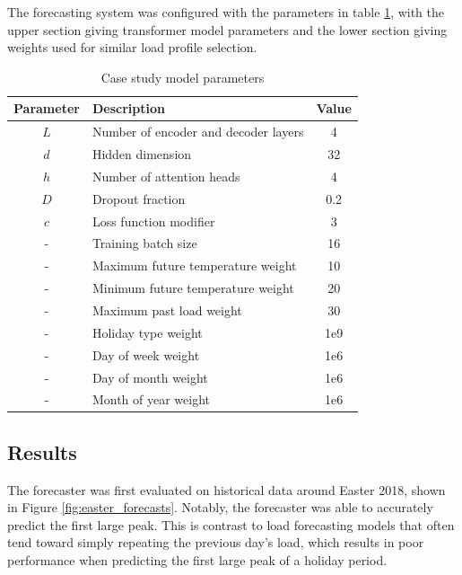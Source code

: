 \documentclass[conference]{IEEEtran}
\begin{document}
The forecasting system was configured with the parameters in table \ref{table:parameters}, with the upper section giving transformer model parameters and the lower section giving weights used for similar load profile selection.

\begin{table}[htbp]
	\caption{Case study model parameters}
	\begin{center}
		\begin{tabular}{clc}
			\textbf{Parameter}&\textbf{Description}&\textbf{Value} \\
			\hline
			$L$ & Number of encoder and decoder layers & 4 \\
			$d$ & Hidden dimension & 32 \\
			$h$ & Number of attention heads & 4 \\
			$D$ & Dropout fraction & 0.2 \\
			$c$ & Loss function modifier & 3 \\
			-   & Training batch size & 16 \\
			\hline
			-   & Maximum future temperature weight & 10 \\
			-   & Minimum future temperature weight & 20 \\
			-   & Maximum past load weight & 30 \\
			-   & Holiday type weight & 1e9 \\
			-   & Day of week weight & 1e6 \\
			-   & Day of month weight & 1e6 \\
			-   & Month of year weight & 1e6 \\
			
		\end{tabular}
		\label{table:parameters}
	\end{center}
\end{table}

\subsection{Results}

The forecaster was first evaluated on historical data around Easter 2018, shown in Figure \ref{fig:easter_forecasts}.
Notably, the forecaster was able to accurately predict the first large peak.
This is contrast to load forecasting models that often tend toward simply repeating the previous day's load, which results in poor performance when predicting the first large peak of a holiday period.
\end{document}
